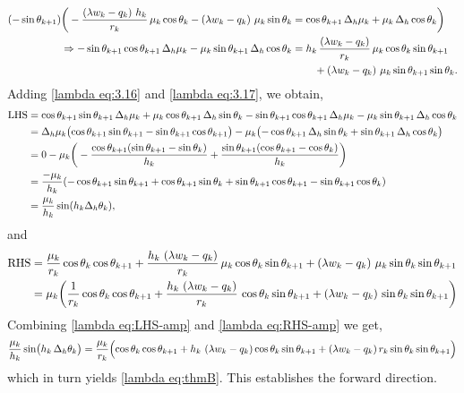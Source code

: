 \documentclass[12pt,reqno]{amsart}
\numberwithin{equation}{section}
\begin{document}
\begin{align}
    (-\sin\theta_{k+1})\bigg(-\frac{\left(\lambda w_k-q_k\right)\, h_k}{r_k}\,\mu_k\cos\theta_k
- \left(\lambda w_k-q_k\right)\,\mu_k\sin\theta_k
&= \cos\theta_{k+1}\,\Delta_h\mu_k + \mu_k\,\Delta_h\cos\theta_k\bigg)\\
\Rightarrow -\sin\theta_{k+1}\cos\theta_{k+1}\,\Delta_h\mu_k
- \mu_k\sin\theta_{k+1}\,\Delta_h\cos\theta_k
&=h_k\,\frac{\left(\lambda w_k-q_k\right)}{r_k}\,\mu_k\cos\theta_k\sin\theta_{k+1} \notag
\\ &\hspace{0.75cm} + \left(\lambda w_k-q_k\right)\,\mu_k\sin\theta_{k+1}\sin\theta_k .
\label{lambda eq:3.17}
\end{align}
Adding \eqref{lambda eq:3.16} and \eqref{lambda eq:3.17}, we obtain, 
\begin{align}
\text{LHS} &= \cos\theta_{k+1}\sin\theta_{k+1}\,\Delta_h\mu_k
+ \mu_k\cos\theta_{k+1}\,\Delta_h\sin\theta_k
- \sin\theta_{k+1}\cos\theta_{k+1}\,\Delta_h\mu_k
- \mu_k\sin\theta_{k+1}\,\Delta_h\cos\theta_k \notag\\
&= \Delta_h\mu_k\bigl(\cos\theta_{k+1}\sin\theta_{k+1}
- \sin\theta_{k+1}\cos\theta_{k+1}\bigr) -\mu_k\bigl(-\cos\theta_{k+1}\,\Delta_h\sin\theta_k
+ \sin\theta_{k+1}\,\Delta_h\cos\theta_k\bigr) \notag\\ 
&= 0 - \mu_k\bigg(-\frac{\cos\theta_{k+1}(\sin\theta_{k+1} - \sin\theta_k)}{h_k}+\frac{\sin\theta_{k+1}(\cos\theta_{k+1}-\cos\theta_k)}{h_k}\bigg) \notag  \\
&=\frac{-\mu_k}{h_k}(-\cos\theta_{k+1}\sin\theta_{k+1} + \cos\theta_{k+1}\sin\theta_k + \sin\theta_{k+1}\cos\theta_{k+1} - \sin\theta_{k+1}\cos\theta_k) \notag\\
&=\frac{\mu_k }{h_k}\sin(h_k\Delta_h\theta_k),
\label{lambda eq:LHS-amp}
\end{align}
and
\begin{align}
\text{RHS}&=\frac{\mu_k}{r_k}\cos\theta_k\cos\theta_{k+1}
+ \frac{h_k\,\left(\lambda w_k-q_k\right)}{r_k}\,\mu_k\cos\theta_k\sin\theta_{k+1}
+ \left(\lambda w_k-q_k\right)\,\mu_k\sin\theta_k\sin\theta_{k+1} \notag\\
&=\mu_k\bigg(\frac{1}{r_k}\cos\theta_k\cos\theta_{k+1}
+ \frac{h_k\,\left(\lambda w_k-q_k\right)}{r_k}\,\cos\theta_k\sin\theta_{k+1}
+ \left(\lambda w_k-q_k\right)\,\sin\theta_k\sin\theta_{k+1}\bigg)
\label{lambda eq:RHS-amp}
\end{align}
Combining \eqref{lambda eq:LHS-amp} and \eqref{lambda eq:RHS-amp} we get,
\begin{equation*}
\frac{\mu_k}{h_k}\sin\bigl(h_k\,\Delta_h\theta_k\bigr)
=\frac{\mu_k}{r_k}\Bigl(\cos\theta_k\cos\theta_{k+1}
+ h_k\,\left(\lambda w_k-q_k\right)\cos\theta_k\sin\theta_{k+1}
+ \left(\lambda w_k-q_k\right)r_k\sin\theta_k\sin\theta_{k+1}\Bigr)
\end{equation*}
which in turn yields \eqref{lambda eq:thmB}. This establishes the forward direction.
\end{document}
